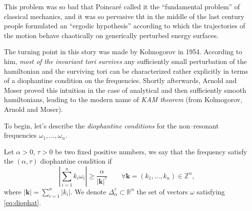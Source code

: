 \documentclass[english,fontsize=11pt,paper=a5,oneside]{scrbook}
\newcommand{\Z}{\mathbb{Z}}
\newcommand{\R}{\mathbb{R}}
\theoremstyle{definition}
\begin{document}
This problem was so bad that Poincar\'e called it the ``fundamental problem'' of classical mechanics, and it was so pervasive tht in the middle of the last century people formulated an ``ergodic hypothesis'' according to which the trajectories of the motion behave chaotically on generically perturbed energy surfaces.

The turning point in this story was made by Kolmogorov in 1954.
According to him, \emph{most of the invariant tori survives} any sufficiently small perturbation of the hamiltonian and the surviving tori can be characterized rather explicitly in terms of a diophantine condition on the frequencies.
Shortly afterwards, Arnold and Moser proved this intuition in the case of analytical and then sufficiently smooth hamiltonians,
leading to the modern name of \emph{KAM theorem} (from Kolmogorov, Arnold and Moser).

To begin, let's describe the \emph{diophantine conditions} for the non--resonant frequencies $\omega_1, \ldots, \omega_n$.

\begin{tcolorbox}
Let $\alpha>0$, $\tau>0$ be two fixed positive numbers, we say that the frequency satisfy the $(\alpha,\tau)$ diophantine condition if
\begin{equation}\label{eq:diophat}
    \left|\sum_{i=1}^n k_i \omega_i \right| \geq \frac{\alpha}{|\bm k|^\tau} \qquad \forall \bm k=(k_1, \ldots, k_n)\in\Z^n,
\end{equation}
where $|\bm k| = \sum_{i=1}^n |k_i|$.
We denote $\Delta_\alpha^\tau\subset\R^n$ the set of vectors $\omega$ satisfying \eqref{eq:diophat}.
\end{tcolorbox}
\end{document}
